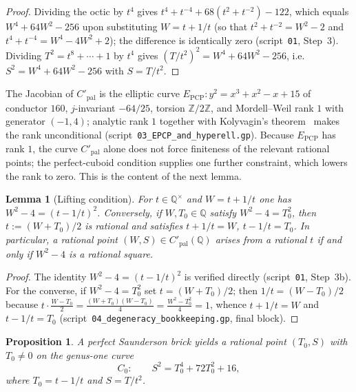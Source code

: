 \documentclass[11pt,reqno]{amsart}
\theoremstyle{plain}
\newtheorem{proposition}[theorem]{Proposition}
\newtheorem{lemma}[theorem]{Lemma}
\theoremstyle{definition}
\newcommand{\Q}{\mathbb{Q}}
\newcommand{\Z}{\mathbb{Z}}
\begin{document}
\begin{proof}
Dividing the octic by $t^4$ gives
$t^4+t^{-4}+68(t^2+t^{-2})-122$, which equals $W^4+64W^2-256$ upon
substituting $W=t+1/t$ (so that $t^2+t^{-2}=W^2-2$ and
$t^4+t^{-4}=W^4-4W^2+2$); the difference is identically zero
(script~\texttt{01}, Step~3). Dividing $T^2=t^8+\cdots+1$ by $t^4$ gives
$(T/t^2)^2=W^4+64W^2-256$, i.e.\ $S^2=W^4+64W^2-256$ with $S=T/t^2$.
\end{proof}

The Jacobian of $C'_{\mathrm{pal}}$ is the elliptic curve
$E_{\mathrm{PCP}}:y^2=x^3+x^2-x+15$ of conductor $160$, $j$-invariant
$-64/25$, torsion $\Z/2\Z$, and Mordell--Weil rank $1$ with generator
$(-1,4)$; analytic rank $1$ together with Kolyvagin's theorem~\cite{kolyvagin} makes the
rank unconditional (script~\texttt{03\_EPCP\_and\_hyperell.gp}). Because
$E_{\mathrm{PCP}}$ has rank $1$, the curve $C'_{\mathrm{pal}}$ alone does not
force finiteness of the relevant rational points; the perfect-cuboid condition
supplies one further constraint, which lowers the rank to zero. This is the
content of the next lemma.

\begin{lemma}[Lifting condition]\label{lem:lift}
For $t\in\Q^\times$ and $W=t+1/t$ one has $W^2-4=(t-1/t)^2$. Conversely, if
$W,T_0\in\Q$ satisfy $W^2-4=T_0^2$, then $t:=(W+T_0)/2$ is rational and
satisfies $t+1/t=W$, $t-1/t=T_0$. In particular, a rational point
$(W,S)\in C'_{\mathrm{pal}}(\Q)$ arises from a rational $t$ \emph{if and only
if} $W^2-4$ is a rational square.
\end{lemma}

\begin{proof}
The identity $W^2-4=(t-1/t)^2$ is verified directly
(script~\texttt{01}, Step~3b). For the converse, if $W^2-4=T_0^2$ set
$t=(W+T_0)/2$; then $1/t=(W-T_0)/2$ because $t\cdot\tfrac{W-T_0}{2}
=\tfrac{(W+T_0)(W-T_0)}{4}=\tfrac{W^2-T_0^2}{4}=1$, whence $t+1/t=W$ and
$t-1/t=T_0$ (script~\texttt{04\_degeneracy\_bookkeeping.gp}, final block).
\end{proof}

\begin{proposition}\label{prop:C0}
A perfect Saunderson brick yields a rational point $(T_0,S)$ with $T_0\neq0$ on
the genus-one curve
\[
C_0:\qquad S^2=T_0^4+72T_0^2+16 ,
\]
where $T_0=t-1/t$ and $S=T/t^2$.
\end{proposition}
\end{document}
